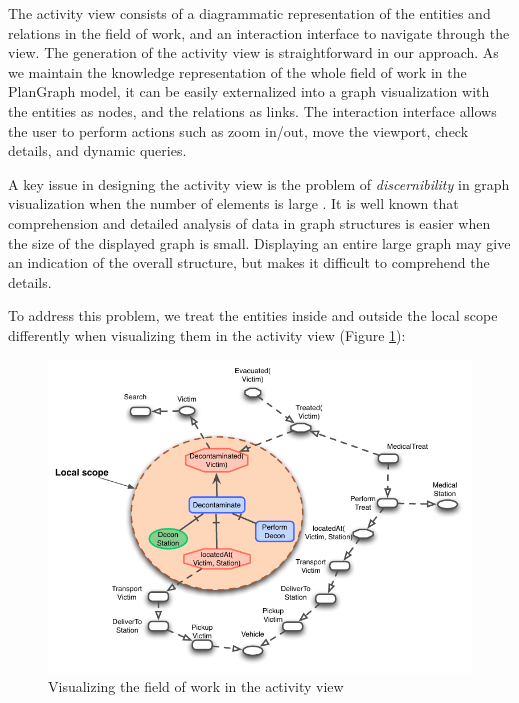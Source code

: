 The activity view consists of a diagrammatic representation of the entities and relations in the field of work, and an interaction interface to navigate through the view. The generation of the activity view is straightforward in our approach. As we maintain the knowledge representation of the whole field of work in the PlanGraph model, it can be easily externalized into a graph visualization with the entities as nodes, and the relations as links. The interaction interface allows the user to perform actions such as zoom in/out, move the viewport, check details, and dynamic queries.

A key issue in designing the activity view is the problem of \emph{discernibility} in graph visualization when the number of elements is large \cite{Herman2000}. It is well known that comprehension and detailed analysis of data in graph structures is easier when the size of the displayed graph is small. Displaying an entire large graph may give an indication of the overall structure, but makes it difficult to comprehend the details. 

To address this problem, we treat the entities inside and outside the local scope differently when visualizing them in the activity view (Figure \ref{fig:activity_view}):
\begin{figure}[htbp] %
	\centering
	\includegraphics{activity_view.pdf} 
	\caption{Visualizing the field of work in the activity view}
	\label{fig:activity_view}
\end{figure}

